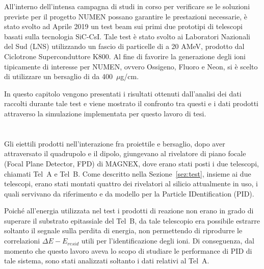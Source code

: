 
All'interno dell'intensa campagna di studi in corso per verificare se le soluzioni previste per il progetto NUMEN possano garantire le prestazioni necessarie, è stato svolto ad Aprile 2019 un test beam sui primi due prototipi di telescopi basati sulla tecnologia SiC-CsI.
Tale test è stato svolto ai Laboratori Nazionali del Sud (LNS) utilizzando un fascio di particelle di  a 20 AMeV, prodotto dal Ciclotrone Superconduttore K800.
Al fine di favorire la generazione degli ioni tipicamente di interesse per NUMEN, ovvero Ossigeno, Fluoro e Neon, si è scelto di utilizzare un bersaglio di  da 400~$\mu$g/cm.

In questo capitolo vengono presentati i risultati ottenuti dall'analisi dei dati raccolti durante tale test e viene mostrato il confronto tra questi e i dati prodotti attraverso la simulazione implementata per questo lavoro di tesi. 

\section{}


Gli eiettili prodotti nell'interazione fra proiettile e bersaglio, dopo aver attraversato il quadrupolo e il dipolo, giungevano al rivelatore di piano focale (Focal Plane Detector, FPD) di MAGNEX, dove erano stati posti i due telescopi, chiamati Tel~A e Tel~B. 
Come descritto nella Sezione~\ref{sez:test}, insieme ai due telescopi, erano stati montati quattro dei rivelatori al silicio attualmente in uso, i quali servivano da riferimento e da modello per la Particle IDentification (PID).

Poiché all'energia utilizzata nel test i prodotti di reazione non erano in grado di superare il substrato epitassiale del Tel~B, da tale telescopio era possibile estrarre soltanto il segnale sulla perdita di energia, non permettendo di riprodurre le correlazioni $\Delta E - E_{resid}$ utili per l'identificazione degli ioni.
Di conseguenza, dal momento che questo lavoro aveva lo scopo di studiare le performance di PID di tale sistema, sono stati analizzati soltanto i dati relativi al Tel~A.


\subsection{}


